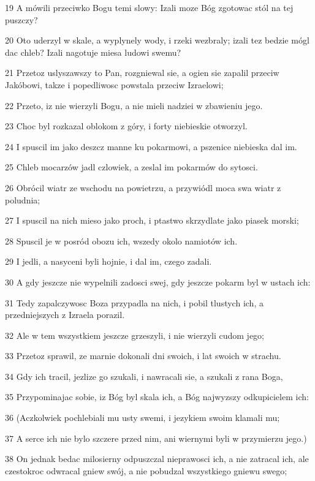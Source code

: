 \par 19 A mówili przeciwko Bogu temi slowy: Izali moze Bóg zgotowac stól na tej puszczy?
\par 20 Oto uderzyl w skale, a wyplynely wody, i rzeki wezbraly; izali tez bedzie mógl dac chleb? Izali nagotuje miesa ludowi swemu?
\par 21 Przetoz uslyszawszy to Pan, rozgniewal sie, a ogien sie zapalil przeciw Jakóbowi, takze i popedliwosc powstala przeciw Izraelowi;
\par 22 Przeto, iz nie wierzyli Bogu, a nie mieli nadziei w zbawieniu jego.
\par 23 Choc byl rozkazal oblokom z góry, i forty niebieskie otworzyl.
\par 24 I spuscil im jako deszcz manne ku pokarmowi, a pszenice niebieska dal im.
\par 25 Chleb mocarzów jadl czlowiek, a zeslal im pokarmów do sytosci.
\par 26 Obrócil wiatr ze wschodu na powietrzu, a przywiódl moca swa wiatr z poludnia;
\par 27 I spuscil na nich mieso jako proch, i ptastwo skrzydlate jako piasek morski;
\par 28 Spuscil je w posród obozu ich, wszedy okolo namiotów ich.
\par 29 I jedli, a nasyceni byli hojnie, i dal im, czego zadali.
\par 30 A gdy jeszcze nie wypelnili zadosci swej, gdy jeszcze pokarm byl w ustach ich:
\par 31 Tedy zapalczywosc Boza przypadla na nich, i pobil tlustych ich, a przedniejszych z Izraela porazil.
\par 32 Ale w tem wszystkiem jeszcze grzeszyli, i nie wierzyli cudom jego;
\par 33 Przetoz sprawil, ze marnie dokonali dni swoich, i lat swoich w strachu.
\par 34 Gdy ich tracil, jezlize go szukali, i nawracali sie, a szukali z rana Boga,
\par 35 Przypominajac sobie, iz Bóg byl skala ich, a Bóg najwyzszy odkupicielem ich:
\par 36 (Aczkolwiek pochlebiali mu usty swemi, i jezykiem swoim klamali mu;
\par 37 A serce ich nie bylo szczere przed nim, ani wiernymi byli w przymierzu jego.)
\par 38 On jednak bedac milosierny odpuszczal nieprawosci ich, a nie zatracal ich, ale czestokroc odwracal gniew swój, a nie pobudzal wszystkiego gniewu swego;
